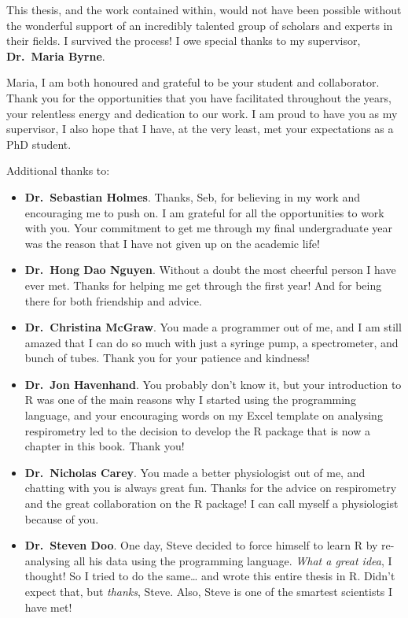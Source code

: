 \documentclass[a4paper,10pt, oneside]{memoir}
\begin{document}
This thesis, and the work contained within, would not have been possible without the wonderful support of an incredibly talented group of scholars and experts in their fields. I survived the process! I owe special thanks to my supervisor, \textbf{Dr.~Maria Byrne}.

Maria, I am both honoured and grateful to be your student and collaborator. Thank you for the opportunities that you have facilitated throughout the years, your relentless energy and dedication to our work. I am proud to have you as my supervisor, I also hope that I have, at the very least, met your expectations as a PhD student.

Additional thanks to:

\begin{itemize}
\tightlist
\item
  \textbf{Dr.~Sebastian Holmes}. Thanks, Seb, for believing in my work and encouraging me to push on. I am grateful for all the opportunities to work with you. Your commitment to get me through my final undergraduate year was the reason that I have not given up on the academic life!
\item
  \textbf{Dr.~Hong Dao Nguyen}. Without a doubt the most cheerful person I have ever met. Thanks for helping me get through the first year! And for being there for both friendship and advice.
\item
  \textbf{Dr.~Christina McGraw}. You made a programmer out of me, and I am still amazed that I can do so much with just a syringe pump, a spectrometer, and bunch of tubes. Thank you for your patience and kindness!
\item
  \textbf{Dr.~Jon Havenhand}. You probably don't know it, but your introduction to R was one of the main reasons why I started using the programming language, and your encouraging words on my Excel template on analysing respirometry led to the decision to develop the R package that is now a chapter in this book. Thank you!
\item
  \textbf{Dr.~Nicholas Carey}. You made a better physiologist out of me, and chatting with you is always great fun. Thanks for the advice on respirometry and the great collaboration on the R package! I can call myself a physiologist because of you.
\item
  \textbf{Dr.~Steven Doo}. One day, Steve decided to force himself to learn R by re-analysing all his data using the programming language. \textit{What a great idea}, I thought! So I tried to do the same\ldots{} and wrote this entire thesis in R. Didn't expect that, but \emph{thanks}, Steve. Also, Steve is one of the smartest scientists I have met!

\end{itemize}
\end{document}
